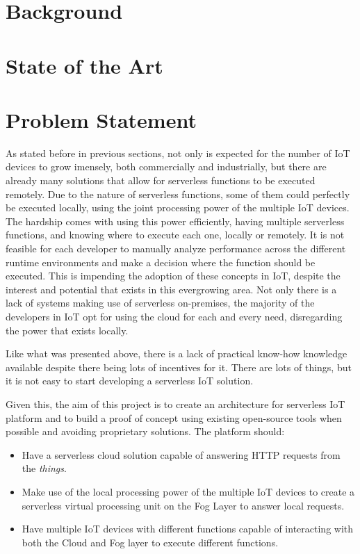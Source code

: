 \documentclass[conference]{IEEEtran}
\begin{document}
\section{Background}

\section{State of the Art}

\section{Problem Statement}

As stated before in previous sections, not only is expected for the number of IoT
devices to grow imensely, both commercially and industrially, but there are
already many solutions that allow for serverless functions to be executed
remotely. Due to the nature of serverless functions, some of them could perfectly
be executed locally, using the joint processing power of the multiple IoT devices.
The hardship comes with using this power efficiently, having multiple serverless
functions, and knowing where to execute each one, locally or remotely. It is not
feasible for each developer to manually analyze performance across the different
runtime environments and make a decision where the function should be executed.
This is impending the adoption of these concepts in IoT, despite the interest and
potential that exists in this evergrowing area. Not only there is a lack of
systems making use of serverless on-premises, the majority of the developers in
IoT opt for using the cloud for each and every need, disregarding the power that
exists locally.

Like what was presented above, there is a lack of practical know-how knowledge
available despite there being lots of incentives for it. There are lots of things,
but it is not easy to start developing a serverless IoT solution.

Given this, the aim of this project is to create an architecture for serverless IoT
platform and to build a proof of concept using existing open-source tools when
possible and avoiding proprietary solutions. The platform should:
\begin{itemize}
    \item Have a serverless cloud solution capable of answering HTTP requests from
        the \textit{things}.
    \item Make use of the local processing power of the multiple IoT devices to
        create a serverless virtual processing unit on the Fog Layer to answer
        local requests.
    \item Have multiple IoT devices with different functions capable of
        interacting with both the Cloud and Fog layer to execute different
        functions. 
\end{itemize}
\end{document}
